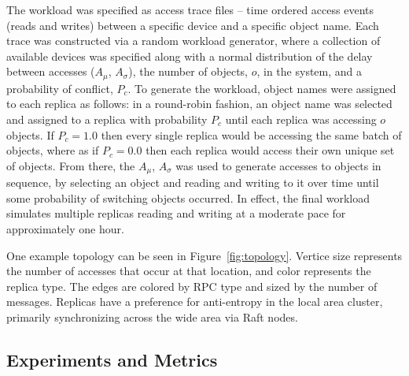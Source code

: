 \documentclass[10pt,conference,letterpaper]{IEEEtran}
\begin{document}
The workload was specified as access trace files -- time ordered access events (reads and
writes) between a specific device and a specific object name.
Each trace was constructed via a random workload generator, where a collection of
available devices was specified along with a normal distribution of the delay between
accesses ($A_{\mu}$, $A_{\sigma}$), the number of objects, $o$, in the system, and a
probability of conflict, $P_c$.
To generate the workload, object names were assigned to each replica as follows: in a
round-robin fashion, an object name was selected and assigned to a replica with
probability $P_c$ until each replica was accessing $o$ objects.
If $P_c = 1.0$ then every single replica would be accessing the same batch of objects,
where as if $P_c = 0.0$ then each replica would access their own unique set of objects.
From there, the $A_{\mu}$, $A_{\sigma}$ was used to generate accesses to objects in
sequence, by selecting an object and reading and writing to it over time until some
probability of switching objects occurred.
In effect, the final workload simulates multiple replicas reading and writing at a
moderate pace for approximately one hour.

One example topology can be seen in Figure~\ref{fig:topology}.
Vertice size represents the number of
accesses that occur at that location, and color represents the
replica type.
The edges are colored by RPC type and sized by the
number of messages.
Replicas have a preference for anti-entropy in the local
area cluster, primarily synchronizing across the wide area via Raft nodes.

\subsection{Experiments and Metrics}
\end{document}
